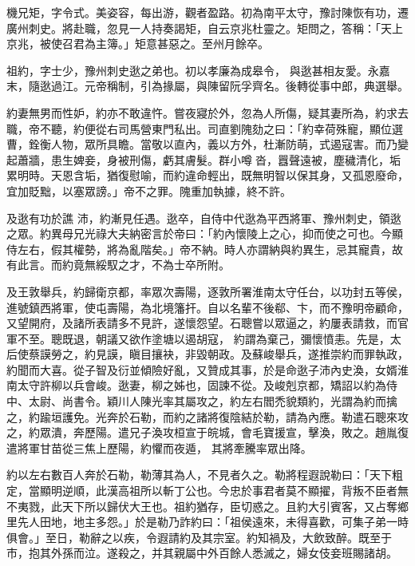 \begin{pinyinscope}
 機兄矩，字令式。美姿容，每出游，觀者盈路。初為南平太守，豫討陳恢有功，遷廣州刺史。將赴職，忽見一人持奏謁矩，自云京兆杜靈之。矩問之，答稱：「天上京兆，被使召君為主簿。」矩意甚惡之。至州月餘卒。



 祖約，字士少，豫州刺史逖之弟也。初以孝廉為成皋令，
 與逖甚相友愛。永嘉末，隨逖過江。元帝稱制，引為掾屬，與陳留阮孚齊名。後轉從事中郎，典選舉。



 約妻無男而性妒，約亦不敢違忤。嘗夜寢於外，忽為人所傷，疑其妻所為，約求去職，帝不聽，約便從右司馬營東門私出。司直劉隗劾之曰：「約幸荷殊寵，顯位選曹，銓衡人物，眾所具瞻。當敬以直內，義以方外，杜漸防萌，式遏寇害。而乃變起蕭牆，患生婢妾，身被刑傷，虧其膚髮。群小噂沓，囂聲遠被，塵穢清化，垢累明時。天恩含垢，猶復慰喻，而約違命輕出，既無明智以保其身，又孤恩廢命，宜加貶黜，以塞眾謗。」帝不之罪。隗重加執據，終不許。



 及逖有功於譙
 沛，約漸見任遇。逖卒，自侍中代逖為平西將軍、豫州刺史，領逖之眾。約異母兄光祿大夫納密言於帝曰：「約內懷陵上之心，抑而使之可也。今顯侍左右，假其權勢，將為亂階矣。」帝不納。時人亦謂納與約異生，忌其寵貴，故有此言。而約竟無綏馭之才，不為士卒所附。



 及王敦舉兵，約歸衛京都，率眾次壽陽，逐敦所署淮南太守任台，以功封五等侯，進號鎮西將軍，使屯壽陽，為北境籓扞。自以名輩不後郗、卞，而不豫明帝顧命，又望開府，及諸所表請多不見許，遂懷怨望。石聰嘗以眾逼之，約屢表請救，而官軍不至。聰既退，朝議又欲作塗塘以遏胡寇，
 約謂為棄己，彌懷憤恚。先是，太后使蔡謨勞之，約見謨，瞋目攘袂，非毀朝政。及蘇峻舉兵，遂推崇約而罪執政，約聞而大喜。從子智及衍並傾險好亂，又贊成其事，於是命逖子沛內史渙，女婿淮南太守許柳以兵會峻。逖妻，柳之姊也，固諫不從。及峻剋京都，矯詔以約為侍中、太尉、尚書令。穎川人陳光率其屬攻之，約左右閻禿貌類約，光謂為約而擒之，約踰垣護免。光奔於石勒，而約之諸將復陰結於勒，請為內應。勒遣石聰來攻之，約眾潰，奔歷陽。遣兄子渙攻桓宣于皖城，會毛寶援宣，擊渙，敗之。趙胤復遣將軍甘苗從三焦上歷陽，約懼而夜遁，
 其將牽騰率眾出降。



 約以左右數百人奔於石勒，勒薄其為人，不見者久之。勒將程遐說勒曰：「天下粗定，當顯明逆順，此漢高祖所以斬丁公也。今忠於事君者莫不顯擢，背叛不臣者無不夷戮，此天下所以歸伏大王也。祖約猶存，臣切惑之。且約大引賓客，又占奪鄉里先人田地，地主多怨。」於是勒乃詐約曰：「祖侯遠來，未得喜歡，可集子弟一時俱會。」至日，勒辭之以疾，令遐請約及其宗室。約知禍及，大飲致醉。既至于市，抱其外孫而泣。遂殺之，并其親屬中外百餘人悉滅之，婦女伎妾班賜諸胡。




\end{pinyinscope}
